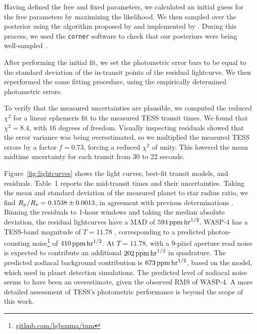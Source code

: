 \documentclass[12pt,twocolumn,tighten]{aastex62}
\begin{document}
Having defined the free and fixed parameters, we calculated an initial
guess for the free parameters by maximizing the likelihood.  We then
sampled over the posterior using the algorithm proposed by
\citet{goodman_ensemble_2010} and implemented by
\citet{foreman-mackey_emcee_2013}.  During this process, we used the
\texttt{corner} software to check that our posteriors were being
well-sampled~\citep{corner_2016}.

After performing the initial fit, we set the photometric error bars to
be equal to the standard deviation of the in-transit points of the
residual lightcurve.  We then reperformed the same fitting procedure,
using the empirically determined photometric errors.

To verify that the measured uncertainties are plausible, we computed the
reduced $\chi^2$ for a linear ephemeris fit to the measured TESS transit
times.  We found that $\chi^2 = 8.4$, with 16 degrees of freedom.
Visually inspecting residuals showed that the error variance was being
overestimated, so we multiplied the measured TESS errors by a factor
$f=0.73$, forcing a reduced $\chi^2$ of unity.  This lowered the mean
midtime uncertainty for each transit from 30 to 22
seconds.

Figure~\ref{fig:lightcurves} shows the light curves, best-fit transit
models, and residuals.  Table~1 reports the mid-transit times and
their uncertainties.
Taking the mean and standard deviation of the measured planet to star
radius ratio, we find $R_{\rm p}/R_\star=0.1538\pm0.0013$, in
agreement with previous determinations
\citep{wilson_wasp-4b_2008,gillon_improved_2009,winn_transit_2009,southworth_high-precision_2009}.
Binning the residuals to 1-hour windows and taking the median absolute
deviation, the residual lightcurves have a MAD of $594\,{\rm
ppm}\,{\rm hr}^{1/2}$.  WASP-4 has a TESS-band magnitude of $T=11.78$
\citep{stassun_TIC_2018}, corresponding to a predicted photon-counting
noise\footnote{\url{github.com/lgbouma/tnm}} of $410\,{\rm ppm}\,{\rm
hr}^{1/2}$.  At $T=11.78$, with a 9-pixel aperture read noise is
expected to contribute an additional $202\,{\rm ppm}\,{\rm hr}^{1/2}$ in
quadrature.  The predicted zodiacal background contribution is
$673\,{\rm ppm}\,{\rm hr}^{1/2}$, based on the
\citet{winn_photonflux_2013} model, which \citet{Sullivan_2015}
used in planet detection simulations.  The predicted level
of zodiacal noise seems to have been an overestimate, given the observed
RMS of WASP-4.  A more detailed assessment of TESS's photometric
performance is beyond the scope of this work.
\end{document}
